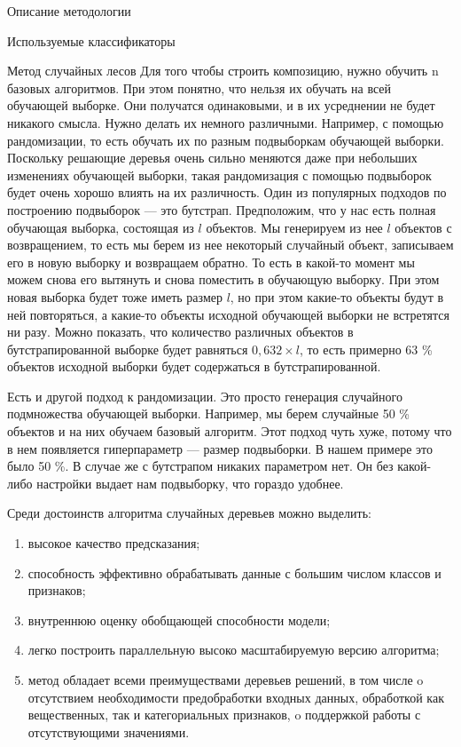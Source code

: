 \begin{section}{Описание методологии}
\begin{subsection}{Используемые классификаторы}
\begin{subsubsection}{Метод случайных лесов}
 Для того чтобы строить композицию, нужно обучить n базовых алгоритмов. При этом понятно, что нельзя их обучать на всей обучающей выборке. Они получатся одинаковыми, и в их усреднении не будет никакого смысла. Нужно делать их немного различными. Например, с помощью рандомизации, то есть обучать их по разным подвыборкам обучающей выборки. Поскольку решающие деревья очень сильно меняются даже при небольших изменениях обучающей выборки, такая рандомизация с помощью подвыборок будет очень хорошо влиять на их различность. Один из популярных подходов по построению подвыборок — это бутстрап. Предположим, что у нас есть полная обучающая выборка, состоящая из $l$ объектов. Мы генерируем из нее $l$ объектов с возвращением, то есть мы берем из нее некоторый случайный объект, записываем его в новую выборку и возвращаем обратно. То есть в какой-то момент мы можем снова его вытянуть и снова поместить в обучающую выборку. При этом новая выборка будет тоже иметь размер $l$, но при этом какие-то объекты будут в ней повторяться, а какие-то объекты исходной обучающей выборки не встретятся ни разу.  Можно показать, что количество различных объектов в бутстрапированной выборке будет равняться $0,632 \times l$, то есть примерно 63 \% объектов исходной выборки будет содержаться в бутстрапированной.

 Есть и другой подход к рандомизации. Это просто генерация случайного подмножества обучающей выборки. Например, мы берем случайные 50 \% объектов и на них обучаем базовый алгоритм. Этот подход чуть хуже, потому что в нем появляется гиперпараметр — размер подвыборки. В нашем примере это было 50 \%. В случае же с бутстрапом никаких параметром нет. Он без какой-либо настройки выдает нам подвыборку, что гораздо удобнее.

Среди достоинств алгоритма случайных деревьев можно выделить:
\begin{enumerate}
  \item высокое качество предсказания;
  \item способность эффективно обрабатывать данные с большим числом классов и признаков;
  \item внутреннюю оценку обобщающей способности модели;
  \item	легко построить параллельную высоко масштабируемую версию алгоритма;
  \item	метод обладает всеми преимуществами деревьев решений, в том числе
  o	отсутствием необходимости предобработки входных данных, обработкой как вещественных, так и категориальных признаков,
  o	поддержкой работы с отсутствующими значениями.


\end{enumerate}
\end{subsubsection}
\end{subsection}
\end{section}

